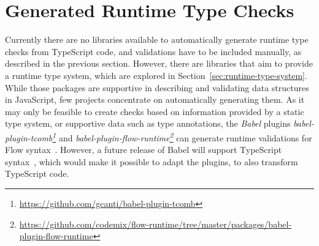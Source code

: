 
\section{Generated Runtime Type Checks}
\label{sec:existing-projects}

Currently there are no libraries available to automatically generate runtime type checks from TypeScript code, and validations have to be included manually, as described in the previous section. However, there are libraries that aim to provide a runtime type system, which are explored in Section~\ref{sec:runtime-type-system}. While those packages are supportive in describing and validating data structures in JavaScript, few projects concentrate on automatically generating them. As it may only be feasible to create checks based on information provided by a static type system, or supportive data such as type annotations, the \emph{Babel} plugins \emph{babel-plugin-tcomb\footnote{\url{https://github.com/gcanti/babel-plugin-tcomb}}} and \emph{babel-plugin-flow-runtime\footnote{\url{https://github.com/codemix/flow-runtime/tree/master/packages/babel-plugin-flow-runtime}}} can generate runtime validations for Flow syntax~\cites{RuntimeTypeSystem:tcomb:babel, RuntimeTypeSystem:flow-runtime:babel}. However, a future release of Babel will support TypeScript syntax~\cite{Babel:TypeScript}, which would make it possible to adapt the plugins, to also transform TypeScript code.
